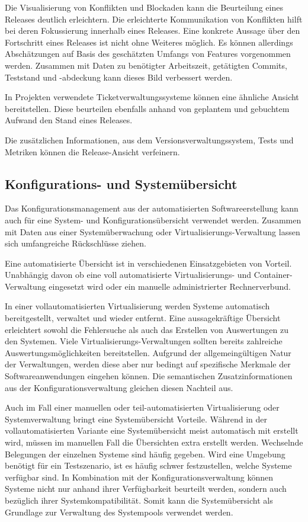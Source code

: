 Die Visualisierung von Konflikten und Blockaden kann die Beurteilung eines Releases deutlich erleichtern. Die erleichterte Kommunikation von Konflikten hilft bei deren Fokussierung innerhalb eines Releases. Eine konkrete Aussage über den Fortschritt eines Releases ist nicht ohne Weiteres möglich. Es können allerdings Abschätzungen auf Basis des geschätzten Umfangs von Features vorgenommen werden. Zusammen mit Daten zu benötigter Arbeitszeit, getätigten Commits, Teststand und -abdeckung kann dieses Bild verbessert werden.

In Projekten verwendete Ticketverwaltungssysteme können eine ähnliche Ansicht bereitstellen. Diese beurteilen ebenfalls anhand von geplantem und gebuchtem Aufwand den Stand eines Releases.

Die zusätzlichen Informationen, aus dem Versionsverwaltungssystem, Tests und Metriken können die Release-Ansicht verfeinern. 

\subsection{Konfigurations- und Systemübersicht}
\label{subsubsec:configuration-system-overview}

Das Konfigurationsmanagement aus der automatisierten Softwareerstellung kann auch für eine System- und Konfigurationsübersicht verwendet werden. Zusammen mit Daten aus einer Systemüberwachung oder Virtualisierungs-Verwaltung lassen sich umfangreiche Rückschlüsse ziehen. 

Eine automatisierte Übersicht ist in verschiedenen Einsatzgebieten von Vorteil. Unabhängig davon ob eine voll automatisierte Virtualisierungs- und Container-Verwaltung eingesetzt wird oder ein manuelle administrierter Rechnerverbund.

In einer vollautomatisierten Virtualisierung werden Systeme automatisch bereitgestellt, verwaltet und wieder entfernt. Eine aussagekräftige Übersicht erleichtert sowohl die Fehlersuche als auch das Erstellen von Auswertungen zu den Systemen. Viele Virtualisierungs\hyp{}Verwaltungen sollten bereits zahlreiche Auswertungsmöglichkeiten bereitstellen. Aufgrund der allgemeingültigen Natur der Verwaltungen, werden diese aber nur bedingt auf spezifische Merkmale der Softwareanwendungen eingehen können. Die semantischen Zusatzinformationen aus der Konfigurationsverwaltung gleichen diesen Nachteil aus.

Auch im Fall einer manuellen oder teil-automatisierten Virtualisierung oder Systemverwaltung bringt eine Systemübersicht Vorteile. Während in der vollautomatisierten Variante eine Systemübersicht meist automatisch mit erstellt wird, müssen im manuellen Fall die Übersichten extra erstellt werden. Wechselnde Belegungen der einzelnen Systeme sind häufig gegeben. Wird eine Umgebung benötigt für ein Testszenario, ist es häufig schwer festzustellen, welche Systeme verfügbar sind. In Kombination mit der Konfigurationsverwaltung können Systeme nicht nur anhand ihrer Verfügbarkeit beurteilt werden, sondern auch bezüglich ihrer Systemkompatibilität. Somit kann die Systemübersicht als Grundlage zur Verwaltung des Systempools verwendet werden.

